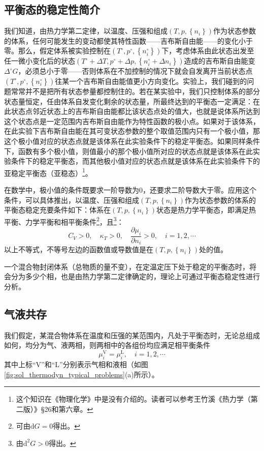 \documentclass[main.tex]{subfiles}
\begin{document}
\subsection{平衡态的稳定性简介}
我们知道，由热力学第二定律，以温度、压强和组成$\left(T,p,\left\{n_i\right\}\right)$作为状态参数的体系，任何可能发生的变动都使其特性函数——吉布斯自由能——的变化小于零。那么，假定体系被实验控制在$\left(T^\circ,p^\circ,\left\{n_i^\circ\right\}\right)$下，考虑体系由此状态出发至任一微小变化后的状态$\left(T^\circ+\Delta T,p^\circ+\Delta p,\left\{n_i^\circ+\Delta n_i\right\}\right)$造成的吉布斯自由能变$\Delta^\circ G$，必须总小于零——否则体系在不加控制的情况下就会自发离开当前状态点$\left(T^\circ,p^\circ,\left\{n_i^\circ\right\}\right)$往某一个吉布斯自由能值更小方向变化。实验上，我们碰到的问题常常并不是把所有状态参量都控制住的。若在某实验中，我们只控制体系的部分状态量恒定，任由体系自发变化剩余的状态量，所最终达到的平衡态一定满足：在此状态点邻近状态上的吉布斯自由能都比该状态点处的值大，也就是说体系所达到这个状态点是一定范围内吉布斯自由能作为特性函数的极小点。如果对于该体系，在此实验下吉布斯自由能在其可变状态参数的整个取值范围内只有一个极小值，那这个极小值对应的状态点就是该体系在此实验条件下的稳定平衡态。如果同样条件下，函数有多个极小值，则值最小的那个极小值所对应的状态点就是该体系在此实验条件下的稳定平衡态，而其他极小值对应的状态点就是该体系在此实验条件下的亚稳定平衡态（亚稳态）\footnote{这个知识在《物理化学》中是没有介绍的。读者可以参考王竹溪《热力学（第二版）》\S26和第六章。}。

在数学中，极小值的条件既要求一阶导数为0，还要求二阶导数大于零。应用这个条件，可以具体推出，以温度、压强和组成$\left(T,p,\left\{n_i\right\}\right)$作为状态参数的体系的平衡态稳定充要条件如下：体系在$\left(T,p,\left\{n_i\right\}\right)$状态是热力学平衡态，即满足热平衡、力学平衡和相平衡条件\footnote{可由$\mathrm{d}G=0$得出。}，且\footnote{由$\mathrm{d}^2G>0$得出。}：
\[C_V>0,\quad \kappa_T>0,\quad \frac{\partial \mu_i}{\partial n_i}>0,\quad i=1,2,\cdots\]
以上不等式，不等号左边的函数值或导数值是在$\left(T,p,\left\{n_i\right\}\right)$处的值。

一个混合物封闭体系（总物质的量不变），在定温定压下处于稳定的平衡态时，将会分为多少个相，也是由热力学第二定律确定的，理论上可通过平衡态稳定性进行分析。

\subsection{气液共存}
我们假定，某混合物体系在温度和压强的某范围内，凡处于平衡态时，无论总组成如何，均分为气、液两相，则两相中的各组份均应满足相平衡条件
\[\mu_i^\text{V}=\mu_i^\text{L},\quad i=1,2,\cdots\]
其中上标“V”和“L”分别表示气相和液相（如图\ref{fig:sol_thermodyn_typical_problems}(a)所示）。
\end{document}
